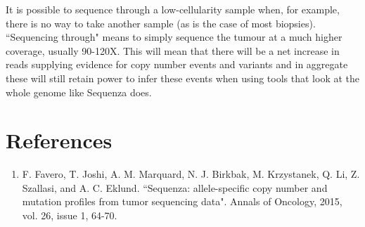 \begin{note}
It is possible to sequence through a low-cellularity sample when, for example, there is no way to take another sample (as is the case of most biopsies). ``Sequencing through" means to simply sequence the tumour at a much higher coverage, usually 90-120X. This will mean that there will be a net increase in reads supplying evidence for copy number events and variants and in aggregate these will still retain power to infer these events when using tools that look at the whole genome like Sequenza does.
\end{note}


\newpage


\section{References}

\begin{enumerate}
  \item F. Favero, T. Joshi, A. M. Marquard, N. J. Birkbak, M. Krzystanek, Q. Li, Z. Szallasi, and A. C. Eklund. ``Sequenza: allele-specific copy number and mutation profiles from tumor sequencing data". Annals of Oncology, 2015, vol. 26, issue 1, 64-70.
\end{enumerate}
